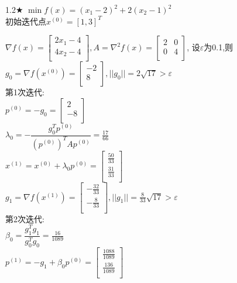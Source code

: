 \begin{problem}{1.2$\bigstar$}
    $\min f(x)=(x_1-2)^2+2(x_2-1)^2$\\
    初始迭代点${x^{(0)}}=[1,3]^T$
\end{problem}
\begin{solution}
    $\nabla f(x)=\begin{bmatrix}
        2x_1-4  \\
        4x_2-4  \\
    \end{bmatrix}, A=\nabla^2 f(x)=\begin{bmatrix}
        2  & 0  \\
        0  & 4  \\
    \end{bmatrix}$,
    设$\varepsilon$为0.1,则\\
    $g_0=\nabla f(x^{(0)})=\begin{bmatrix} -2\\8\\\end{bmatrix},||g_0||=2\sqrt{17}>\varepsilon$\\
    第1次迭代:\\
    $p^{(0)}=-g_0=\begin{bmatrix} 2\\-8\\\end{bmatrix}$\\
    $\lambda_0=-\dfrac{g_0^Tp^{(0)}}{(p^{(0)})^TAp^{(0)}}=\frac{17}{66}$\\
    $x^{(1)}=x^{(0)}+\lambda_0p^{(0)}=\begin{bmatrix} \frac{50}{33}\\\frac{31}{33}\\\end{bmatrix}$\\
    $g_1=\nabla f(x^{(1)})=\begin{bmatrix} -\frac{32}{33}\\-\frac{8}{33}\\\end{bmatrix},||g_1||=\frac{8}{33}\sqrt{17}>\varepsilon$\\
    第2次迭代:\\
    $\beta_0=\dfrac{g_1^Tg_1}{g_0^Tg_0}=\frac{16}{1089}$\\
    $p^{(1)}=-g_1+\beta_0p^{(0)}=\begin{bmatrix} \frac{1088}{1089}\\\frac{136}{1089}\\\end{bmatrix}$\\

\end{solution}
